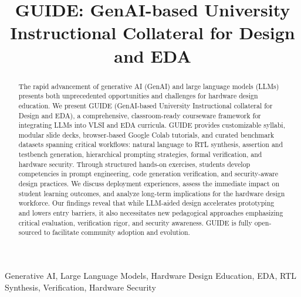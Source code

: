 \documentclass[10pt,conference]{IEEEtran}
\begin{document}
\title{GUIDE: GenAI-based University Instructional Collateral for Design and EDA}

\author{
\and
{}
}

\maketitle

\begin{abstract}
The rapid advancement of generative AI (GenAI) and large language models (LLMs) presents both unprecedented opportunities and challenges for hardware design education. We present GUIDE (GenAI-based University Instructional collateral for Design and EDA), a comprehensive, classroom-ready courseware framework for integrating LLMs into VLSI and EDA curricula. GUIDE provides customizable syllabi, modular slide decks, browser-based Google Colab tutorials, and curated benchmark datasets spanning critical workflows: natural language to RTL synthesis, assertion and testbench generation, hierarchical prompting strategies, formal verification, and hardware security. Through structured hands-on exercises, students develop competencies in prompt engineering, code generation verification, and security-aware design practices. We discuss deployment experiences, assess the immediate impact on student learning outcomes, and analyze long-term implications for the hardware design workforce. Our findings reveal that while LLM-aided design accelerates prototyping and lowers entry barriers, it also necessitates new pedagogical approaches emphasizing critical evaluation, verification rigor, and security awareness. GUIDE is fully open-sourced to facilitate community adoption and evolution.
\end{abstract}

\begin{IEEEkeywords}
Generative AI, Large Language Models, Hardware Design Education, EDA, RTL Synthesis, Verification, Hardware Security
\end{IEEEkeywords}
\end{document}
